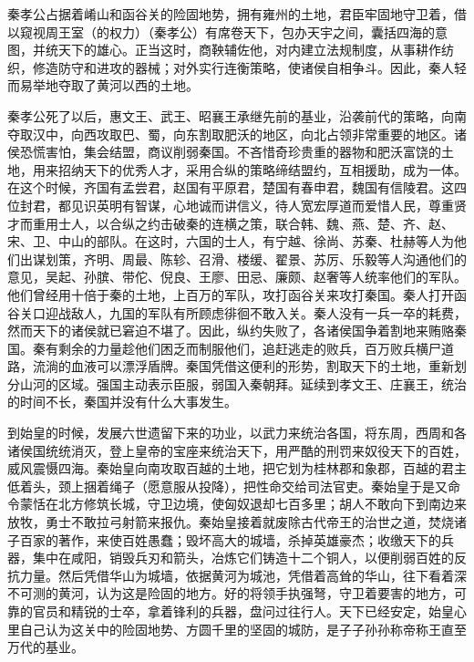 \documentclass[12pt,UTF-8,openany]{ctexbook}
\begin{document}
\begin{normalsize}
    
    秦孝公占据着崤山和函谷关的险固地势，拥有雍州的土地，君臣牢固地守卫着，借以窥视周王室（的权力）（秦孝公）有席卷天下，包办天宇之间，囊括四海的意图，并统天下的雄心。正当这时，商鞅辅佐他，对内建立法规制度，从事耕作纺织，修造防守和进攻的器械；对外实行连衡策略，使诸侯自相争斗。因此，秦人轻而易举地夺取了黄河以西的土地。
    
    秦孝公死了以后，惠文王、武王、昭襄王承继先前的基业，沿袭前代的策略，向南夺取汉中，向西攻取巴、蜀，向东割取肥沃的地区，向北占领非常重要的地区。诸侯恐慌害怕，集会结盟，商议削弱秦国。不吝惜奇珍贵重的器物和肥沃富饶的土地，用来招纳天下的优秀人才，采用合纵的策略缔结盟约，互相援助，成为一体。在这个时候，齐国有孟尝君，赵国有平原君，楚国有春申君，魏国有信陵君。这四位封君，都见识英明有智谋，心地诚而讲信义，待人宽宏厚道而爱惜人民，尊重贤才而重用士人，以合纵之约击破秦的连横之策，联合韩、魏、燕、楚、齐、赵、宋、卫、中山的部队。在这时，六国的士人，有宁越、徐尚、苏秦、杜赫等人为他们出谋划策，齐明、周最、陈轸、召滑、楼缓、翟景、苏厉、乐毅等人沟通他们的意见，吴起、孙膑、带佗、倪良、王廖、田忌、廉颇、赵奢等人统率他们的军队。他们曾经用十倍于秦的土地，上百万的军队，攻打函谷关来攻打秦国。秦人打开函谷关口迎战敌人，九国的军队有所顾虑徘徊不敢入关。秦人没有一兵一卒的耗费，然而天下的诸侯就已窘迫不堪了。因此，纵约失败了，各诸侯国争着割地来贿赂秦国。秦有剩余的力量趁他们困乏而制服他们，追赶逃走的败兵，百万败兵横尸道路，流淌的血液可以漂浮盾牌。秦国凭借这便利的形势，割取天下的土地，重新划分山河的区域。强国主动表示臣服，弱国入秦朝拜。延续到孝文王、庄襄王，统治的时间不长，秦国并没有什么大事发生。
    
    到始皇的时候，发展六世遗留下来的功业，以武力来统治各国，将东周，西周和各诸侯国统统消灭，登上皇帝的宝座来统治天下，用严酷的刑罚来奴役天下的百姓，威风震慑四海。秦始皇向南攻取百越的土地，把它划为桂林郡和象郡，百越的君主低着头，颈上捆着绳子（愿意服从投降），把性命交给司法官吏。秦始皇于是又命令蒙恬在北方修筑长城，守卫边境，使匈奴退却七百多里；胡人不敢向下到南边来放牧，勇士不敢拉弓射箭来报仇。秦始皇接着就废除古代帝王的治世之道，焚烧诸子百家的著作，来使百姓愚蠢；毁坏高大的城墙，杀掉英雄豪杰；收缴天下的兵器，集中在咸阳，销毁兵刃和箭头，冶炼它们铸造十二个铜人，以便削弱百姓的反抗力量。然后凭借华山为城墙，依据黄河为城池，凭借着高耸的华山，往下看着深不可测的黄河，认为这是险固的地方。好的将领手执强弩，守卫着要害的地方，可靠的官员和精锐的士卒，拿着锋利的兵器，盘问过往行人。天下已经安定，始皇心里自己认为这关中的险固地势、方圆千里的坚固的城防，是子子孙孙称帝称王直至万代的基业。
    

\end{normalsize}
\end{document}
